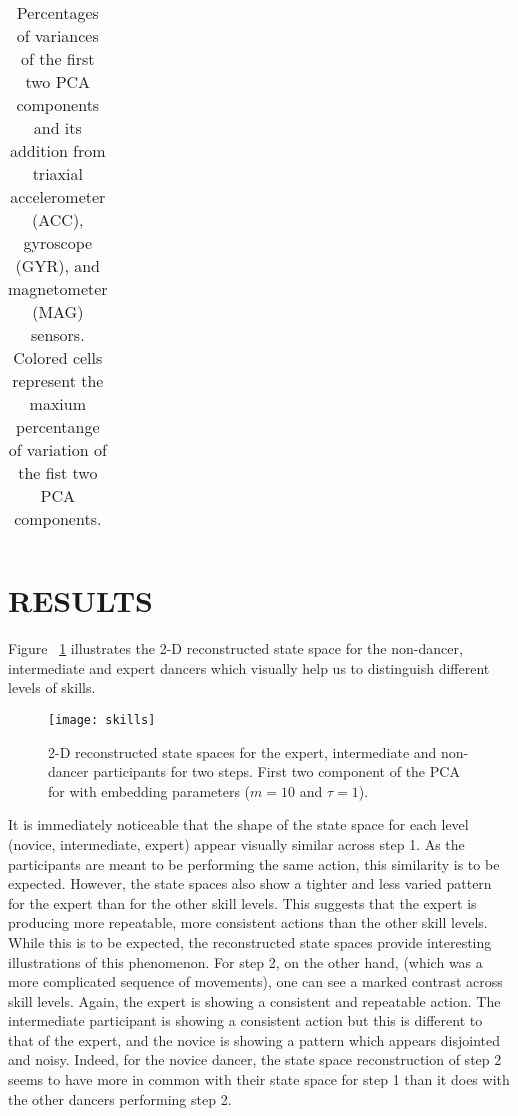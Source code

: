 \documentclass{sigchi}
\begin{document}
\begin{table}
\begin{tabular}{l c c c c c c }
\bottomrule
\end{tabular}

  \caption{Percentages of variances of the first two PCA components and its addition
       from triaxial accelerometer (ACC), gyroscope (GYR), and magnetometer (MAG) sensors.
  Colored cells represent the maxium percentange of variation of the fist two PCA components.}
  \label{tab:table2}
\end{table}



\section{RESULTS}
Figure ~\ref{fig:skills} illustrates the 2-D reconstructed state space for the 
non-dancer, intermediate and expert dancers which visually help us to distinguish different levels of skills. 
\begin{figure}[htbp!] 
  \centering    
  \texttt{[image: skills]}
  \caption[PA]{2-D reconstructed state spaces for the expert, intermediate and 
  non-dancer participants for two steps. First two component of the PCA
  for with embedding parameters ($m = 10$ and $\tau = 1$).}
  \label{fig:skills}
  \end{figure}
It is immediately noticeable that the shape of the state space for each level (novice, intermediate, expert) 
appear visually similar across step 1.  
As the participants are meant to be performing the same action, this similarity is to be expected.  
However, the state spaces also show a tighter and less varied pattern for the expert than for the other skill levels.  
This suggests that the expert is producing more repeatable, more consistent actions than the other skill levels.  
While this is to be expected, the reconstructed state spaces provide interesting illustrations of this phenomenon.  
For step 2, on the other hand, (which was a more complicated sequence of movements),
one can see a marked contrast across skill levels.  
Again, the expert is showing a consistent and repeatable action.  
The intermediate participant is showing a consistent action but this is different to that of the expert, 
and the novice is showing a pattern which appears disjointed and noisy.  
Indeed, for the novice dancer, the state space reconstruction of step 2 seems to have more in common 
with their state space for step 1 than it does with the other dancers performing step 2.  
\end{document}
